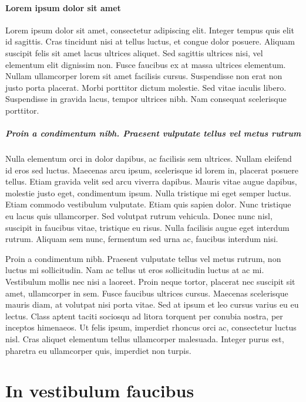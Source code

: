 \paragraph{Lorem ipsum dolor sit amet}

Lorem ipsum dolor sit amet, consectetur adipiscing elit. Integer tempus quis elit id sagittis. Cras tincidunt nisi at tellus luctus, et congue dolor posuere. Aliquam suscipit felis sit amet lacus ultrices aliquet. Sed sagittis ultrices nisi, vel elementum elit dignissim non. Fusce faucibus ex at massa ultrices elementum. Nullam ullamcorper lorem sit amet facilisis cursus. Suspendisse non erat non justo porta placerat. Morbi porttitor dictum molestie. Sed vitae iaculis libero. Suspendisse in gravida lacus, tempor ultrices nibh. Nam consequat scelerisque porttitor.

\subparagraph{Proin a condimentum nibh. Praesent vulputate tellus vel metus rutrum}

Nulla elementum orci in dolor dapibus, ac facilisis sem ultrices. Nullam eleifend id eros sed luctus. Maecenas arcu ipsum, scelerisque id lorem in, placerat posuere tellus. Etiam gravida velit sed arcu viverra dapibus. Mauris vitae augue dapibus, molestie justo eget, condimentum ipsum. Nulla tristique mi eget semper luctus. Etiam commodo vestibulum vulputate. Etiam quis sapien dolor. Nunc tristique eu lacus quis ullamcorper. Sed volutpat rutrum vehicula. Donec nunc nisl, suscipit in faucibus vitae, tristique eu risus. Nulla facilisis augue eget interdum rutrum. Aliquam sem nunc, fermentum sed urna ac, faucibus interdum nisi.




Proin a condimentum nibh. Praesent vulputate tellus vel metus rutrum, non luctus mi sollicitudin. Nam ac tellus ut eros sollicitudin luctus at ac mi. Vestibulum mollis nec nisi a laoreet. Proin neque tortor, placerat nec suscipit sit amet, ullamcorper in sem. Fusce faucibus ultrices cursus. Maecenas scelerisque mauris diam, at volutpat nisi porta vitae. Sed at ipsum et leo cursus varius eu eu lectus. Class aptent taciti sociosqu ad litora torquent per conubia nostra, per inceptos himenaeos. Ut felis ipsum, imperdiet rhoncus orci ac, consectetur luctus nisl. Cras aliquet elementum tellus ullamcorper malesuada. Integer purus est, pharetra eu ullamcorper quis, imperdiet non turpis.

\section{In vestibulum faucibus}

